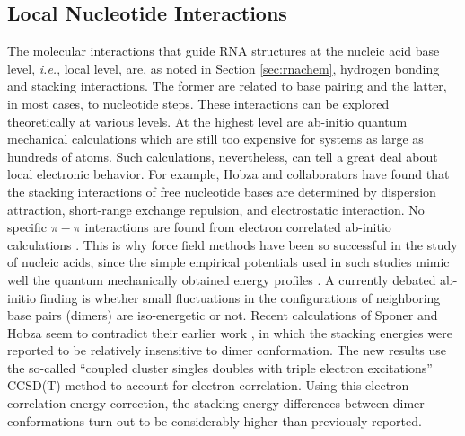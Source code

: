 \subsection{Local Nucleotide Interactions}
\label{sec:local}
The  molecular interactions that  guide RNA  structures at  the nucleic
acid base level, \textit{i.e.}, local  level, are, as noted in Section
\ref{sec:rnachem},  hydrogen bonding  and  stacking interactions.  The
former are related  to base pairing and the latter,  in most cases, to
nucleotide steps. These interactions  can be explored theoretically at
various levels. At the  highest level are ab-initio quantum mechanical
calculations which  are still  too expensive for  systems as  large as
hundreds of atoms.  Such  calculations, nevertheless, can tell a great
deal  about  local  electronic   behavior.   For  example,  Hobza  and
collaborators  have  found  that  the  stacking  interactions  of  free
nucleotide bases  are determined by  dispersion attraction, short-range
exchange  repulsion,  and   electrostatic  interaction.   No  specific
$\pi-\pi$  interactions are found  from electron  correlated ab-initio
calculations \cite{sponer1996,  sponer1997}.  This is  why force field
methods have been  so successful in the study  of nucleic acids, since
the simple empirical potentials  used in such studies mimic  well the quantum
mechanically obtained energy profiles \cite{tung2004, sponer2000}.
A currently debated ab-initio finding is whether small fluctuations in
the   configurations   of   neighboring   base  pairs   (dimers)   are
iso-energetic  or  not.   Recent  calculations  of  Sponer  and  Hobza
\cite{sponer2006}    seem   to    contradict   their    earlier   work
\cite{sponer2000,  hobza2002},  in which  the  stacking energies  were
reported to  be relatively insensitive to dimer  conformation. The new
results  use  the so-called  ``coupled  cluster  singles doubles  with
triple electron excitations'' CCSD(T)  method to account for electron
correlation.  Using  this electron correlation  energy correction, the
stacking energy differences between dimer conformations turn out to be
considerably higher than previously reported.

